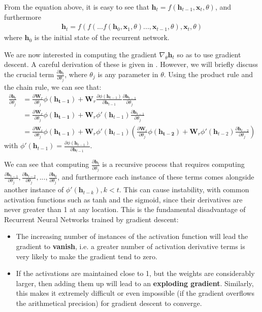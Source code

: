\documentclass[pdftex,12pt,a4paper]{article}
\theoremstyle{definition}
\theoremstyle{remark}
\newcommand*{\V}[1]{\mathbf{#1}}%
\begin{document}
\par From the equation above, it is easy to see that $\V{h}_t = f(\V{h}_{t-1}, \V{x}_t, \theta)$, and furthermore 
\begin{align*}
\V{h}_t = f(f(...f(\V{h}_0, \V{x}_1, \theta)..., \V{x}_{t-1}, \theta), \V{x}_t, \theta)    
\end{align*}
where $\V{h}_0$ is the initial state of the recurrent network. 
\par We are now interested in computing the gradient $\nabla_\theta\V{h}_t$ so as to use gradient descent. A careful derivation of these is given in \cite{Pascanu2012}. However, we will briefly discuss the crucial term $\frac{\partial\V{h}_t}{\partial\theta_j}$, where $\theta_j$ is any parameter in $\theta$. Using the product rule and the chain rule, we can see that:
\begin{align*}
    \frac{\partial\V{h}_t}{\partial\theta_j} &= \frac{\partial\V{W}_r}{\partial\theta_j} \phi(\V{h_{t-1}}) + \V{W}_r\frac{\partial \phi(\V{h}_{t-1})}{\partial\V{h}_{t-1}}\frac{\partial \V{h}_{t-1}}{\partial\theta_j}\\
    &= \frac{\partial\V{W}_r}{\partial\theta_j} \phi(\V{h_{t-1}}) + \V{W}_r\phi'(\V{h}_{t-1})\frac{\partial \V{h}_{t-1}}{\partial\theta_j}\\
    &= \frac{\partial\V{W}_r}{\partial\theta_j} \phi(\V{h_{t-1}}) + \V{W}_r\phi'(\V{h}_{t-1})\left(\frac{\partial\V{W}_r}{\partial\theta_j} \phi(\V{h_{t-2}}) + \V{W}_r\phi'(\V{h}_{t-2})\frac{\partial \V{h}_{t-2}}{\partial\theta_j}\right)
\end{align*}
with $\phi'(\V{h}_{t-1}) = \frac{\partial \phi(\V{h}_{t-1})}{\partial\V{h}_{t-1}}$.
\par We can see that computing $\frac{\partial\V{h}_t}{\partial\theta_j}$ is a recursive process that requires computing $\frac{\partial\V{h}_{t-1}}{\partial\theta_j}, \frac{\partial\V{h}_{t-2}}{\partial\theta_j}, ..., \frac{\partial\V{h}_0}{\partial\theta_j}$, and furthermore each instance of these terms comes alongside another instance of $\phi'(\V{h}_{t-k}), k<t$. This can cause instability, with common activation functions such as tanh and the sigmoid, since their derivatives are never greater than 1 at any location. This is the fundamental disadvantage of Recurrent Neural Networks trained by gradient descent: 
\begin{itemize}
    \item The increasing number of instances of the activation function will lead the gradient to \textbf{vanish}, i.e. a greater number of activation derivative terms is very likely to make the gradient tend to zero.
    \item If the activations are maintained close to 1, but the weights are considerably larger, then adding them up will lead to an \textbf{exploding gradient}. Similarly, this makes it extremely difficult or even impossible (if the gradient overflows the arithmetical precision) for gradient descent to converge.
\end{itemize}
\end{document}
